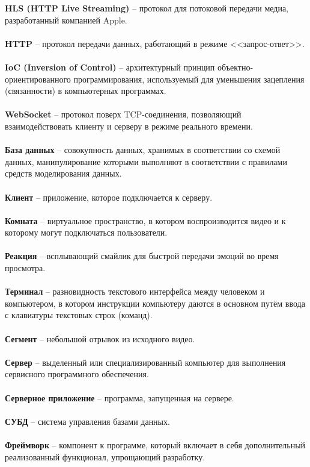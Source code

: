 \documentclass{../includes/TechDoc}
\begin{document}
    \noindent
    \textbf{HLS (HTTP Live Streaming)} -- протокол для потоковой передачи медиа, разработанный компанией Apple.\\\\
    \textbf{HTTP} -- протокол передачи данных, работающий в режиме <<запрос-ответ>>.\\\\
    \textbf{IoC (Inversion of Control)} -- архитектурный принцип объектно-ориентированного программирования, используемый для уменьшения зацепления (связанности) в компьютерных программах.\\\\
    \textbf{WebSocket} -- протокол поверх TCP-соединения, позволяющий взаимодействовать клиенту и серверу в режиме реального времени.\\\\
    \textbf{База данных} -- совокупность данных, хранимых в соответствии со схемой данных, манипулирование которыми выполняют в соответствии с правилами средств моделирования данных.\\\\
    \textbf{Клиент} -- приложение, которое подключается к серверу.\\\\
    \textbf{Комната} -- виртуальное пространство, в котором воспроизводится видео и к которому могут подключаться пользователи.\\\\
    \textbf{Реакция} -- всплывающий смайлик для быстрой передачи эмоций во время просмотра.\\\\
    \textbf{Терминал} -- разновидность текстового интерфейса между человеком и компьютером, в котором инструкции компьютеру даются в основном путём ввода с клавиатуры текстовых строк (команд).\\\\
    \textbf{Сегмент} -- небольшой отрывок из исходного видео.\\\\
    \textbf{Сервер} -- выделенный или специализированный компьютер для выполнения сервисного программного обеспечения.\\\\
    \textbf{Серверное приложение} -- программа, запущенная на сервере.\\\\
    \textbf{СУБД} -- система управления базами данных.\\\\
    \textbf{Фреймворк} -- компонент к программе, который включает в себя дополнительный реализованный функционал, упрощающий разработку.\\\\
\end{document}
